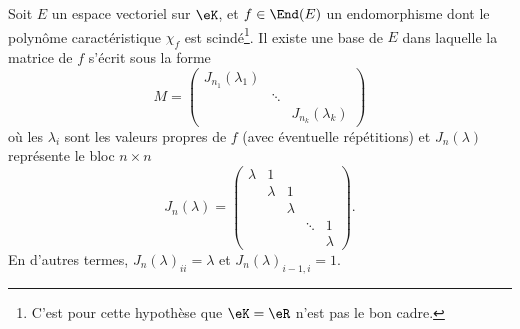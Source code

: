 \begin{theorem}        \label{ThoGGMYooPzMVpe}
    Soit \( E\) un espace vectoriel sur \( \eK\), et \( f\in\End(E)\) un endomorphisme dont le polynôme caractéristique \( \chi_f\) est scindé\footnote{C'est pour cette hypothèse que \( \eK=\eR\) n'est pas le bon cadre.}. Il existe une base de \( E\) dans laquelle la matrice de \( f\) s'écrit sous la forme
    \begin{equation}
        M=\begin{pmatrix}
            J_{n_1}(\lambda_1)    &       &       \\
                &   \ddots    &       \\
                &       &   J_{n_k}(\lambda_k)
        \end{pmatrix}
    \end{equation}
    où les \( \lambda_i\) sont les valeurs propres de \( f\) (avec éventuelle répétitions) et \( J_n(\lambda)\) représente le bloc \( n\times n\)
    \begin{equation}
        J_n(\lambda)=\begin{pmatrix}
            \lambda    &   1    &       &       &   \\  
                &   \lambda    &   1    &       &   \\  
                &       &   \lambda    &       &   \\  
                &       &       &   \ddots    &   1\\  
                &       &       &       &   \lambda    
        \end{pmatrix}.
    \end{equation}
    En d'autres termes, \( J_n(\lambda)_{ii}=\lambda\) et \( J_n(\lambda)_{i-1,i}=1\).    
\end{theorem}

